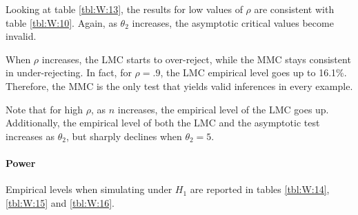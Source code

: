\documentclass[11pt]{article}\usepackage[]{graphicx}\usepackage[]{color}
\begin{document}
Looking at table \ref{tbl:W:13}, the results for low values of $\rho$ are consistent with table \ref{tbl:W:10}. Again, as $\theta_2$ increases, the asymptotic critical values become invalid.

When $\rho$ increases, the LMC starts to over-reject, while the MMC stays consistent in under-rejecting. In fact, for $\rho=.9$, the LMC empirical level goes up to 16.1\%. Therefore, the MMC is the only test that yields valid inferences in every example.

Note that for high $\rho$, as $n$ increases, the empirical level of the LMC goes up. Additionally, the empirical level of both the LMC and the asymptotic test increases as $\theta_2$, but sharply declines when $\theta_2=5$.

\paragraph{Power}

Empirical levels when simulating under $H_1$ are reported in tables \ref{tbl:W:14}, \ref{tbl:W:15} and \ref{tbl:W:16}.
\end{document}
